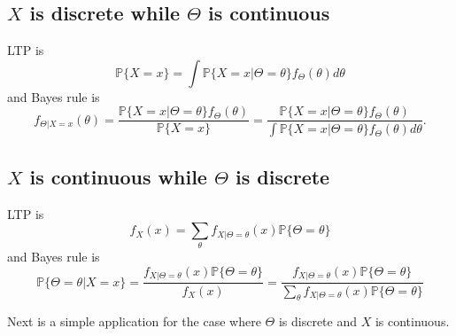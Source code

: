 \documentclass{scrartcl}
\renewcommand{\P}{{\mathbb P}}
\begin{document}
\subsection{$X$ is discrete while $\Theta$ is continuous}
LTP is
\begin{equation*}
    \P \{X = x\} = \int \P\{X = x | \Theta = \theta\} f_{\Theta}(\theta) d\theta
\end{equation*}
and Bayes rule is
\begin{equation*}
    f_{\Theta|X = x}(\theta) = \frac{\P\{X = x| \Theta = \theta\}
    f_{\Theta}(\theta)}{\P\{X = x\}} =  \frac{\P\{X = x| \Theta = \theta\}
    f_{\Theta}(\theta)}{\int \P\{X = x| \Theta = \theta\}
    f_{\Theta}(\theta) d\theta}. 
\end{equation*}

\subsection{$X$ is continuous while $\Theta$ is discrete}
LTP is 
\begin{equation*}
    f_X(x) = \sum_{\theta} f_{X| \Theta = \theta}(x) \P\{\Theta = \theta\}
\end{equation*}
and Bayes rule is
\begin{equation}\label{bayescd}
    \P\{\Theta = \theta | X = x\} = \frac{f_{X|\Theta = \theta}(x)
    \P\{\Theta = \theta\}}{f_X(x)} = \frac{f_{X|\Theta = \theta}(x)
    \P\{\Theta = \theta\}}{\sum_{\theta} f_{X|\Theta = \theta}(x)
    \P\{\Theta = \theta\}}
\end{equation}

Next is a simple application for the case where $\Theta$ is discrete
and $X$ is continuous. 
\end{document}

